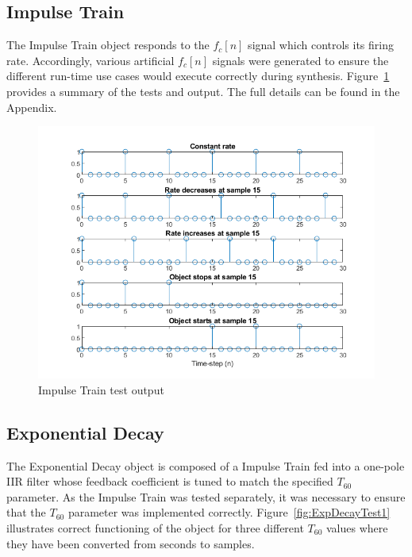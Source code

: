 \documentclass[../main.tex]{subfiles}
\begin{document}
\subsection{Impulse Train}
The Impulse Train object responds to the $f_c[n]$ signal which controls its firing rate. Accordingly, various artificial $f_c[n]$ signals were generated to ensure the different run-time use cases would execute correctly during synthesis. Figure~\ref{fig:ImpulseTrainTest} provides a summary of the tests and output. The full details can be found in the Appendix. 

\begin{figure}[h]
    \centering
    \includegraphics[scale=.65]{./images/plots/ImpulseTrainTest.png}
    \caption{Impulse Train test output}
    \label{fig:ImpulseTrainTest}
\end{figure}

\subsection{Exponential Decay}
The Exponential Decay object is composed of a Impulse Train fed into a one-pole IIR filter whose feedback coefficient is tuned to match the specified $T_{60}$ parameter. As the Impulse Train was tested separately, it was necessary to ensure that the $T_{60}$ parameter was implemented correctly. Figure~\ref{fig:ExpDecayTest1} illustrates correct functioning of the object for three different $T_{60}$ values where they have been converted from seconds to samples. 
\end{document}
